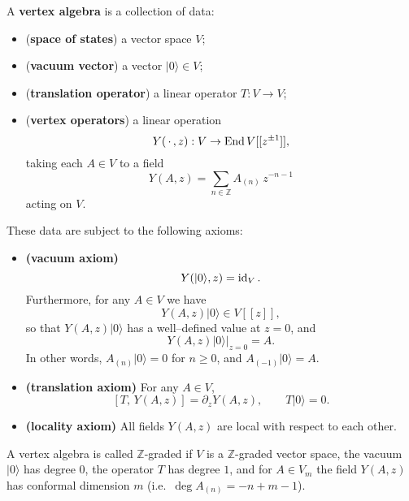 \documentclass[12pt]{article}
\begin{document}
\begin{definition}
    A \textbf{vertex algebra} is a collection of data:
    \begin{itemize}
        \item (\textbf{space of states}) a vector space $V$;
        \item (\textbf{vacuum vector}) a vector $\lvert 0 \rangle \in V$;
        \item (\textbf{translation operator}) a linear operator $T : V \to V$;
        \item (\textbf{vertex operators}) a linear operation
              \[
                  Y(\,\cdot\,,z) : V \to \operatorname{End} V[[z^{\pm1}]],
              \]
              taking each $A \in V$ to a field
              \[
                  Y(A,z) = \sum_{n \in \mathbb{Z}} A_{(n)}\,z^{-n-1}
              \]
              acting on $V$.
    \end{itemize}

    These data are subject to the following axioms:
    \begin{itemize}
        \item \textbf{(vacuum axiom)}
              \[
                  Y(\lvert 0 \rangle, z) = \operatorname{id}_V.
              \]
              Furthermore, for any $A \in V$ we have
              \[
                  Y(A,z)\lvert 0 \rangle \in V[[z]],
              \]
              so that $Y(A,z)\lvert 0 \rangle$ has a well–defined value at $z=0$, and
              \[
                  Y(A,z)\lvert 0 \rangle\big|_{z=0} = A.
              \]
              In other words, $A_{(n)}\lvert 0 \rangle = 0$ for $n \ge 0$, and
              $A_{(-1)}\lvert 0 \rangle = A$.

        \item \textbf{(translation axiom)}
              For any $A \in V$,
              \[
                  [T,\,Y(A,z)] = \partial_z Y(A,z),
                  \qquad
                  T\lvert 0 \rangle = 0.
              \]

        \item \textbf{(locality axiom)}
              All fields $Y(A,z)$ are local with respect to each other.
    \end{itemize}

    A vertex algebra is called \(\mathbb{Z}\)-graded if \(V\) is a
    \(\mathbb{Z}\)-graded vector space,
    the vacuum \(\lvert 0 \rangle\) has degree \(0\),
    the operator \(T\) has degree \(1\), and for \(A \in V_m\) the field \(Y(A,z)\)
    has conformal dimension \(m\) (i.e.\ $\deg A_{(n)} = -n + m - 1$).
\end{definition}
\end{document}
